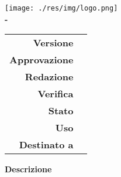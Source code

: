 \thispagestyle{empty}
\begin{titlepage}
	\begin{center}
		\texttt{[image: ./res/img/logo.png]}\\	
		\large \textbf{\Gruppo\hspace{1.5mm}-\hspace{1.5mm}\NomeProgetto}
		\vfill
		\Huge \textbf{\docTitle}
		\vspace*{\fill}
        \vfill
        \large

        \begin{tabular}{r|l}
			\textbf{Versione} & \docVersion \\
			\textbf{Approvazione} & \approv \\
			\textbf{Redazione} & \red \\                        	                       	
			\textbf{Verifica} & \ver \\
			\textbf{Stato} & \state \\
			\textbf{Uso} & \use \\
			\textbf{Destinato a} & \destinatari
		\end{tabular}
		        
		\vfill
		\normalsize
		\textbf{Descrizione}\\
		\textit{\desc} \\
		\vfill
		\small\texttt{\Mail}
	\end{center}
\end{titlepage}
